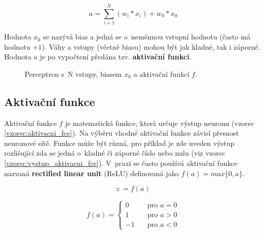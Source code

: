 \begin{equation} \label{vzorec:perceptron}
  a = \sum_{i=1}^{N} (w_i * x_i) + w_0 * x_0
\end{equation}

Hodnota $x_0$ se nazývá bias a jedná se o~neměnnou vstupní hodnotu (často má hodnotu $+1$). Váhy a vstupy (včetně biasu) mohou být jak kladné, tak i záporné. Hodnota $a$ je po vypočtení předána tzv. \textbf{aktivační funkci}.

\begin{figure}[H]
  \begin{center}
  \label{obrazek:perceptron}
  \caption{Perceptron s~N vstupy, biasem $x_0$ a aktivační funkcí $f$.}
  \end{center}
\end{figure}

\subsection*{Aktivační funkce}
Aktivační funkce $f$ je matematická funkce, která určuje výstup neuronu (vzorec \ref{vzorec:aktivacni_fce}). Na výběru vhodné aktivační funkce závisí přesnost neuronové sítě. Funkce může být různá, pro příklad je zde uveden výstup rozlišující zda se jedná o~kladné či záporné číslo nebo nulu (viz vzorec \ref{vzorec:vystup_aktivacni_fce}). V~praxi se často používá aktivační funkce nazvaná \textbf{rectified linear unit} (ReLU) \cite{deeplearningbook} definovaná jako $f(a) = max\{0, a\}$.

\begin{equation} \label{vzorec:aktivacni_fce}
  z~= f(a)
\end{equation}

\begin{equation}
  \label{vzorec:vystup_aktivacni_fce}
   f(a) =
    \begin{cases}
      0       & \quad \text{pro } a = 0\\
      1       & \quad \text{pro } a > 0\\
      -1       & \quad \text{pro } a < 0
    \end{cases}
\end{equation}

